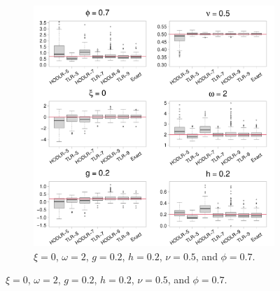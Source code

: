 \documentclass[conference]{IEEEtran}
\begin{document}
\begin{figure}[htp!]
\begin{subfigure}{0.44\textwidth}
  \includegraphics[width=\linewidth]{./figures/boxplot_0.700000_0.200000_0.200000.pdf}
   \caption{  $\xi = 0$, $\omega = 2$, $g = 0.2$, $h = 0.2$, $\nu = 0.5$, and $\phi = 0.7$.}
\end{subfigure}


\end{figure}
\end{document}
